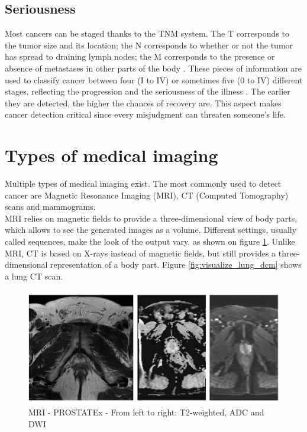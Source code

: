 \subsection{Seriousness}
\setlength{\marginparwidth}{3cm}\leavevmode {}Most cancers can be staged thanks to the TNM system. The T corresponds to the tumor size and its location; the N corresponds to whether or not the tumor has spread to draining lymph nodes; the M corresponds to the presence or absence of metastases in other parts of the body \cite{21}. These pieces of information are used to classify cancer between four (I to IV) or sometimes five (0 to IV) different stages, reflecting the progression and the seriousness of the illness \cite{22}. The earlier they are detected, the higher the chances of recovery are. This aspect makes cancer detection critical since every misjudgment can threaten someone's life. 


\section{Types of medical imaging}
\label{sec:medical_imaging}
\setlength{\marginparwidth}{3cm}\leavevmode {}Multiple types of medical imaging exist. The most commonly used to detect cancer are Magnetic Resonance Imaging (MRI), CT (Computed Tomography) scans and mammograms.\\
MRI relies on magnetic fields to provide a three-dimensional view of body parts, which allows to see the generated images as a volume. Different settings, usually called sequences, make the look of the output vary, as shown on figure \ref{fig:PROSTATEx-t2-adc-dwi}.
Unlike MRI, CT is based on X-rays instead of magnetic fields, but still provides a three-dimensional representation of a body part. Figure \ref{fig:visualize_lung_dcm} shows a lung CT scan.

\begin{figure}[!h]
\centering
\includegraphics[width=1\textwidth, keepaspectratio=true]{./figures/PROSTATEx-t2-adc-dwi.png}
\caption{MRI - PROSTATEx - From left to right: T2-weighted, ADC and DWI}
\label{fig:PROSTATEx-t2-adc-dwi}
\end{figure}


